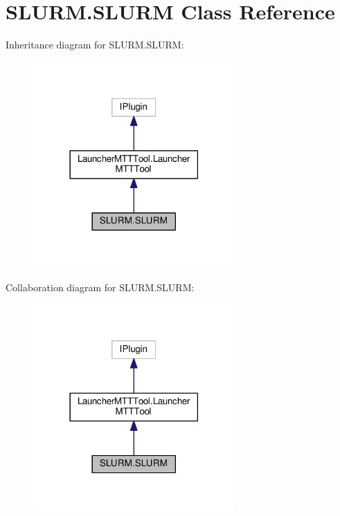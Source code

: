\hypertarget{classSLURM_1_1SLURM}{\section{S\-L\-U\-R\-M.\-S\-L\-U\-R\-M Class Reference}
\label{classSLURM_1_1SLURM}
}


Inheritance diagram for S\-L\-U\-R\-M.\-S\-L\-U\-R\-M\-:
\nopagebreak
\begin{figure}[H]
\begin{center}
\leavevmode
\includegraphics[width=218pt]{classSLURM_1_1SLURM__inherit__graph}
\end{center}
\end{figure}


Collaboration diagram for S\-L\-U\-R\-M.\-S\-L\-U\-R\-M\-:
\nopagebreak
\begin{figure}[H]
\begin{center}
\leavevmode
\includegraphics[width=218pt]{classSLURM_1_1SLURM__coll__graph}
\end{center}
\end{figure}
